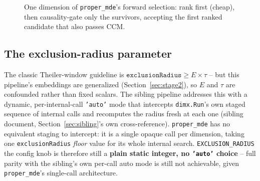 \documentclass[11pt]{article}
\begin{document}
\begin{figure}[H]
\centering
{}
\caption{One dimension of \texttt{proper\_mde}'s forward selection: rank first (cheap), then causality-gate only the survivors, accepting the first ranked candidate that also passes CCM.}
\label{fig:mde-flow}
\end{figure}

\subsection{The exclusion-radius parameter}
\label{sec:exclusion-radius}
The classic Theiler-window guideline is $\texttt{exclusionRadius} \ge E \times \tau$ -- but this pipeline's embeddings are generalized (Section~\ref{sec:stage2}), so $E$ and $\tau$ are confounded rather than fixed scalars. The sibling pipeline addresses this with a dynamic, per-internal-call \texttt{'auto'} mode that intercepts \texttt{dimx.Run}'s own staged sequence of internal calls and recomputes the radius fresh at each one (sibling document, Section~\ref{sec:sibling}'s own cross-reference). \texttt{proper\_mde} has no equivalent staging to intercept: it is a single opaque call per dimension, taking one \texttt{exclusionRadius} \emph{floor} value for its whole internal search. \texttt{EXCLUSION\_RADIUS} the config knob is therefore still a \textbf{plain static integer, no \texttt{'auto'} choice} -- full parity with the sibling's own per-call auto mode is still not achievable, given \texttt{proper\_mde}'s single-call architecture.
\end{document}
